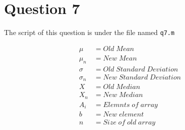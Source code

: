 \documentclass{article}
\theoremstyle{remark}
\begin{document}
\newpage

\section{Question 7}
The script of this question is under the file named \texttt{q7.m} \par
\begin{align*}
    \mu      & = Old \; Mean                  \\
    \mu_n    & = New \; Mean                  \\
    \sigma   & = Old\; Standard \;Deviation   \\
    \sigma_n & = New \; Standard \; Deviation \\
    X        & = Old \;Median                 \\
    X_n      & = New\; Median                 \\
    A_i      & =Elemnts\; of \; array         \\
    b        & = New\;element                 \\
    n        & = Size \;of\; old\; array
\end{align*}
\end{document}
